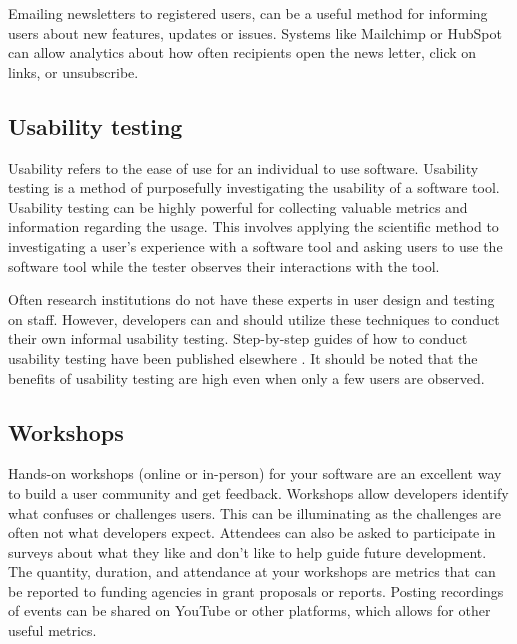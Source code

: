 \documentclass{article}
\begin{document}
Emailing newsletters to registered users, can be a useful method for informing users about new features, updates or issues. Systems like Mailchimp \cite{mailchimp} or HubSpot \cite{hubspot} can allow analytics about how often recipients open the news letter, click on links, or unsubscribe.

\subsection{Usability testing}

Usability refers to the ease of use for an individual to use software. Usability testing is a method of purposefully investigating the usability of a software tool. Usability testing can be highly powerful for collecting valuable metrics and information regarding the usage. This involves applying the scientific method to investigating a user's experience with a software tool and asking users to use the software tool while the tester observes their interactions with the tool. 

Often research institutions do not have these experts in user design and testing on staff. However, developers can and should utilize these techniques to conduct their own informal usability testing. Step-by-step guides of how to conduct usability testing have been published elsewhere \cite{savonen_2021}.  It should be noted that the benefits of usability testing are high even when only a few users are observed. 

\subsection{Workshops}
Hands-on workshops (online\cite{dillon_experiences_2021} or in-person) for your software are an excellent way to build a user community and get feedback. Workshops allow developers identify what confuses or challenges users. This can be illuminating as the challenges are often not what developers expect. Attendees can also be asked to participate in surveys about what they like and don't like to help guide future development. The quantity, duration, and attendance at your workshops are metrics that can be reported to funding agencies in grant proposals or reports. Posting recordings of events can be shared on YouTube or other platforms, which allows for other useful metrics. 
\end{document}

